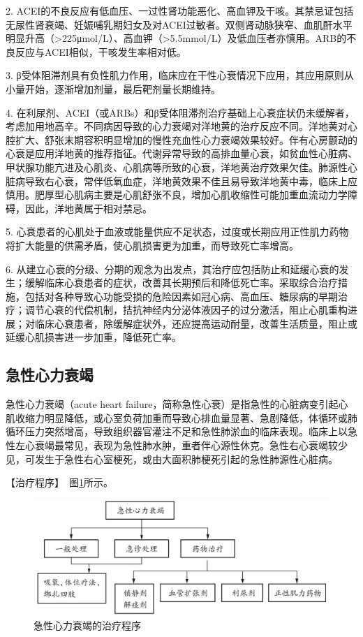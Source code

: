 2.
ACEI的不良反应有低血压、一过性肾功能恶化、高血钾及干咳。其禁忌证包括无尿性肾衰竭、妊娠哺乳期妇女及对ACEI过敏者。双侧肾动脉狭窄、血肌酐水平明显升高（\textgreater{}225μmol/L）、高血钾（\textgreater{}5.5mmol/L）及低血压者亦慎用。ARB的不良反应与ACEI相似，干咳发生率相对低。

3.
β受体阻滞剂具有负性肌力作用，临床应在干性心衰情况下应用，其应用原则从小量开始，逐渐增加剂量，最后靶剂量长期维持。

4.
在利尿剂、ACEI（或ARBs）和β受体阻滞剂治疗基础上心衰症状仍未缓解者，考虑加用地高辛。不同病因导致的心力衰竭对洋地黄的治疗反应不同。洋地黄对心腔扩大、舒张末期容积明显增加的慢性充血性心力衰竭效果较好。伴有心房颤动的心衰是应用洋地黄的推荐指征。代谢异常导致的高排血量心衰，如贫血性心脏病、甲状腺功能亢进及心肌炎、心肌病等所致的心衰，洋地黄治疗效果欠佳。肺源性心脏病导致右心衰，常伴低氧血症，洋地黄效果不佳且易导致洋地黄中毒，临床上应慎用。肥厚型心肌病主要是心肌舒张不良，增加心肌收缩性可能加重血流动力学障碍，因此，洋地黄属于相对禁忌。

5.
心衰患者的心肌处于血液或能量供应不足状态，过度或长期应用正性肌力药物将扩大能量的供需矛盾，使心肌损害更为加重，而导致死亡率增高。

6.
从建立心衰的分级、分期的观念为出发点，其治疗应包括防止和延缓心衰的发生；缓解临床心衰患者的症状，改善其长期预后和降低死亡率。采取综合治疗措施，包括对各种导致心功能受损的危险因素如冠心病、高血压、糖尿病的早期治疗；调节心衰的代偿机制，拮抗神经内分泌体液因子的过分激活，阻止心肌重构进展；对临床心衰患者，除缓解症状外，还应提高运动耐量，改善生活质量，阻止或延缓心肌损害进一步加重，降低死亡率。


\subsection{急性心力衰竭}

急性心力衰竭（acute heart
failure，简称急性心衰）是指急性的心脏病变引起心肌收缩力明显降低，或心室负荷加重而导致心排血量显著、急剧降低，体循环或肺循环压力突然增高，导致组织器官灌注不足和急性肺淤血的临床表现。临床上以急性左心衰竭最常见，表现为急性肺水肿，重者伴心源性休克。急性右心衰竭较少见，可发生于急性右心室梗死，或由大面积肺梗死引起的急性肺源性心脏病。

【治疗程序】　图\ref{fig2-1-2}所示。

\begin{figure}[!htbp]
 \centering
 \includegraphics{./images/Image00044.jpg}
 \captionsetup{justification=centering}
 \caption{急性心力衰竭的治疗程序}
 \label{fig2-1-2}
  \end{figure} 

